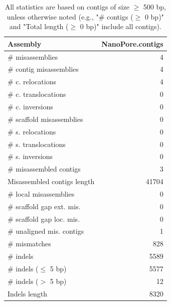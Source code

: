 \documentclass[12pt,a4paper]{article}
\begin{document}
\begin{table}[ht]
\begin{center}
\caption{All statistics are based on contigs of size $\geq$ 500 bp, unless otherwise noted (e.g., "\# contigs ($\geq$ 0 bp)" and "Total length ($\geq$ 0 bp)" include all contigs).}
\begin{tabular}{|l*{1}{|r}|}
\hline
Assembly & NanoPore.contigs \\ \hline
\# misassemblies & 4 \\ \hline
\hspace{2mm}\# contig misassemblies & 4 \\ \hline
\hspace{5mm}\# c. relocations & 4 \\ \hline
\hspace{5mm}\# c. translocations & 0 \\ \hline
\hspace{5mm}\# c. inversions & 0 \\ \hline
\hspace{2mm}\# scaffold misassemblies & 0 \\ \hline
\hspace{5mm}\# s. relocations & 0 \\ \hline
\hspace{5mm}\# s. translocations & 0 \\ \hline
\hspace{5mm}\# s. inversions & 0 \\ \hline
\# misassembled contigs & 3 \\ \hline
Misassembled contigs length & 41704 \\ \hline
\# local misassemblies & 0 \\ \hline
\# scaffold gap ext. mis. & 0 \\ \hline
\# scaffold gap loc. mis. & 0 \\ \hline
\# unaligned mis. contigs & 1 \\ \hline
\# mismatches & 828 \\ \hline
\# indels & 5589 \\ \hline
\hspace{5mm}\# indels ($\leq$ 5 bp) & 5577 \\ \hline
\hspace{5mm}\# indels ($>$ 5 bp) & 12 \\ \hline
Indels length & 8320 \\ \hline
\end{tabular}
\end{center}
\end{table}
\end{document}
